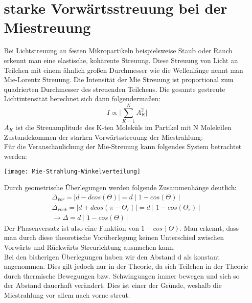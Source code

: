 \section{starke Vorwärtsstreuung bei der Miestreuung}
Bei Lichtstreuung an festen Mikropartikeln beispielsweise Staub oder Rauch erkennt man eine elastische, kohärente Streuung. Diese Streuung von Licht an Teilchen mit einem ähnlich großen Durchmesser wie die Wellenlänge nennt man Mie-Lorentz Streuung. Die Intensität der Mie Streuung ist proportional zum quadrierten Durchmesser des streuenden Teilchens. Die gesamte gestreute Lichtintensität berechnet sich dann folgendermaßen:
\begin{equation}
I\propto \biggl| \sum_{K=1}^N A^2_K \biggl|
\end{equation}
$A_K$ ist die Streuamplitude des K-ten Moleküls im Partikel mit N Molekülen
Zustandekommen der starken Vorwärtsstreuung der Miestrahlung:\\
Für die Veranschaulichung der Mie-Streuung kann folgendes System betrachtet werden:\\
\begin{center}
    \texttt{[image: Mie-Strahlung-Winkelverteilung]}
\end{center}
Durch geometrische Überlegungen werden folgende Zusammenhänge deutlich:
\begin{align*}
\Delta_{vor}=\mid d-dcos(\Theta)\mid=d\mid 1-cos(\Theta) \mid\\
\Delta_{rück}=\mid d+dcos(\pi-\Theta_r)\mid=d\mid 1-cos(\Theta_r) \mid\\
\rightarrow \Delta = d\mid 1-cos(\Theta) \mid
\end{align*}
Der Phasenversatz ist also eine Funktion von $1-cos(\Theta)$.
Man erkennt, dass man durch diese theoretische Vorüberlegung keinen Unterschied zwischen Vorwärts und Rückwärts-Streurichtung ausmachen kann. \\
Bei den bisherigen Überlegungen haben wir den Abstand d als konstant angenommen. Dies gilt jedoch nur in der Theorie, da sich Teilchen in der Theorie durch thermische Bewegungen bzw. Schwingungen immer bewegen und sich so der Abstand dauerhaft verändert. Dies ist einer der Gründe, weshalb die Miestrahlung vor allem nach vorne streut. 
